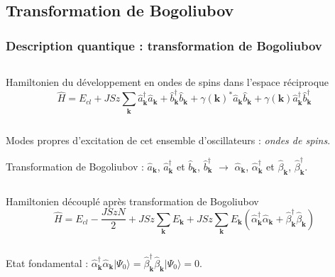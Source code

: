 \documentclass[xcolor=dvipsnames]{beamer}
\newcommand{\an}{\hat{a}}
\newcommand{\cre}{\hat{a}^\dagger}
\newcommand{\h}{\ensuremath{\hat{H}}\xspace}
\newcommand{\ban}{\hat{b}}
\newcommand{\bcre}{\hat{b}^\dagger}
\newcommand{\fond}{\ensuremath{| \Psi_0 \rangle}\xspace}
\newcommand{\ond}{\ensuremath{\mathbf{k}\xspace}}
\newcommand{\ank}{\an_{\ond}}
\newcommand{\crek}{\cre_{\ond}}
\newcommand{\bank}{\ban_{\ond}}
\newcommand{\bcrek}{\bcre_{\ond}}
\newcommand{\gam}{\gamma(\ond{})}
\newcommand{\alcre}{\hat{\alpha}^\dagger_{\ond}}
\newcommand{\alan}{\hat{\alpha}_{\ond}}
\newcommand{\betcre}{\hat{\beta}^\dagger_{\ond}}
\newcommand{\betan}{\hat{\beta}_{\ond}}
\newcommand{\1}{\ensuremath{\ket{\om_1\bom_1}}\xspace}
\newcommand{\2}{\ensuremath{\ket{\om_2\bom_2}}\xspace}
\begin{document}
\subsection{Transformation de Bogoliubov}
\begin{frame}
\frametitle{Description quantique : transformation de Bogoliubov}

\begin{columns}
  \begin{column}{12cm}
  \begin{block}{Hamiltonien du développement en ondes de spins dans l'espace réciproque}
  	\begin{equation}
	\h=E_{cl}+JSz\sum_{\ond}\crek\ank+\bcrek\bank+\gam^*\ank\bank+\gam\crek\bcrek
	\end{equation}
  \end{block}
  \end{column}
\end{columns}

Modes propres d'excitation de cet ensemble d'oscillateurs : \emph{ondes de spins}.

Transformation de Bogoliubov : $\ank$, $\crek$ et $\bank$, $\bcrek$ $\rightarrow$ $\alan$, $\alcre$ et $\betan$, $\betcre$.
\begin{columns}
  \begin{column}{12cm}
  \begin{block}{Hamiltonien découplé après transformation de Bogoliubov}
  	\begin{equation}
	\h=E_{cl}-\frac{JSzN}{2}+JSz\sum_{\ond}E_{\ond}+JSz\sum_{\ond}E_{\ond}(\alcre\alan+\betcre\betan)
	\end{equation}
  \end{block}
  \end{column}
\end{columns}
Etat fondamental : $\alcre\alan\fond=\betcre\betan\fond=0$.
\end{frame}
\end{document}
